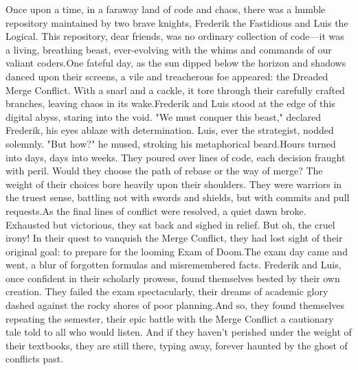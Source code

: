{}{
    Once upon a time, in a faraway land of code and chaos, there was a humble repository maintained by two brave knights, Frederik the Fastidious and Luis the Logical. This repository, dear friends, was no ordinary collection of code—it was a living, breathing beast, ever-evolving with the whims and commands of our valiant coders.One fateful day, as the sun dipped below the horizon and shadows danced upon their screens, a vile and treacherous foe appeared: the Dreaded Merge Conflict. With a snarl and a cackle, it tore through their carefully crafted branches, leaving chaos in its wake.Frederik and Luis stood at the edge of this digital abyss, staring into the void. "We must conquer this beast," declared Frederik, his eyes ablaze with determination. Luis, ever the strategist, nodded solemnly. "But how?" he mused, stroking his metaphorical beard.Hours turned into days, days into weeks. They poured over lines of code, each decision fraught with peril. Would they choose the path of rebase or the way of merge? The weight of their choices bore heavily upon their shoulders. They were warriors in the truest sense, battling not with swords and shields, but with commits and pull requests.As the final lines of conflict were resolved, a quiet dawn broke. Exhausted but victorious, they sat back and sighed in relief. But oh, the cruel irony! In their quest to vanquish the Merge Conflict, they had lost sight of their original goal: to prepare for the looming Exam of Doom.The exam day came and went, a blur of forgotten formulas and misremembered facts. Frederik and Luis, once confident in their scholarly prowess, found themselves bested by their own creation. They failed the exam spectacularly, their dreams of academic glory dashed against the rocky shores of poor planning.And so, they found themselves repeating the semester, their epic battle with the Merge Conflict a cautionary tale told to all who would listen. And if they haven't perished under the weight of their textbooks, they are still there, typing away, forever haunted by the ghost of conflicts past.
}


